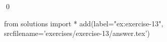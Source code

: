 
\begin{ex} 
  \label{ex:exercise-13}
  
  \qed
\end{ex} 
\begin{python0}
from solutions import *
add(label="ex:exercise-13",
    srcfilename='exercises/exercise-13/answer.tex') 
\end{python0}
